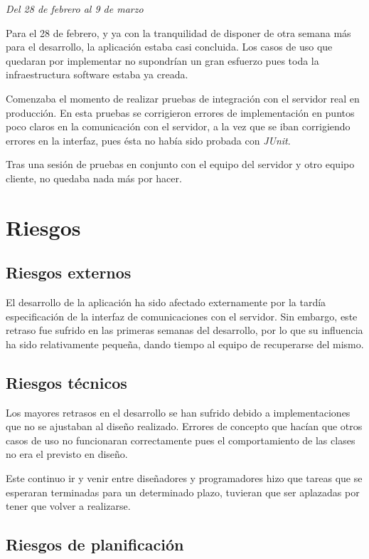 \textit{Del 28 de febrero al 9 de marzo}

Para el 28 de febrero, y ya con la tranquilidad de disponer de otra semana más
para el desarrollo, la aplicación estaba casi concluida. Los casos de uso que
quedaran por implementar no supondrían un gran esfuerzo pues toda la
infraestructura software estaba ya creada.

Comenzaba el momento de realizar pruebas de integración con el servidor real en
producción. En esta pruebas se corrigieron errores de implementación en puntos
poco claros en la comunicación con el servidor, a la vez que se iban
corrigiendo errores en la interfaz, pues ésta no había sido probada con
\textit{JUnit}.

Tras una sesión de pruebas en conjunto con el equipo del servidor y otro equipo
cliente, no quedaba nada más por hacer.

\section{Riesgos}

\subsection{Riesgos externos}

El desarrollo de la aplicación ha sido afectado externamente por la tardía
especificación de la interfaz de comunicaciones con el servidor. Sin embargo,
este retraso fue sufrido en las primeras semanas del desarrollo, por lo que su
influencia ha sido relativamente pequeña, dando tiempo al equipo de recuperarse
del mismo.

\subsection{Riesgos técnicos}

Los mayores retrasos en el desarrollo se han sufrido debido a implementaciones
que no se ajustaban al diseño realizado. Errores de concepto que hacían que
otros casos de uso no funcionaran correctamente pues el comportamiento de las
clases no era el previsto en diseño.

Este continuo ir y venir entre diseñadores y programadores hizo que tareas que
se esperaran terminadas para un determinado plazo, tuvieran que ser aplazadas
por tener que volver a realizarse.

\subsection{Riesgos de planificación}

